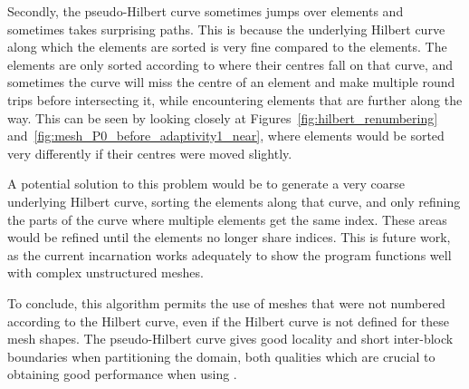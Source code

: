 Secondly, the pseudo-Hilbert curve sometimes jumps over elements and sometimes takes surprising
paths. This is because the underlying Hilbert curve along which the elements are sorted is very fine
compared to the elements. The elements are only sorted according to where their centres fall on that
curve, and sometimes the curve will miss the centre of an element and make multiple round trips
before intersecting it, while encountering elements that are further along the way. This can be seen
by looking closely at Figures~\ref{fig:hilbert_renumbering}
and~\ref{fig:mesh_P0_before_adaptivity1_near}, where elements would be sorted very differently if
their centres were moved slightly.

A potential solution to this problem would be to generate a very coarse underlying Hilbert curve,
sorting the elements along that curve, and only refining the parts of the curve where multiple
elements get the same index. These areas would be refined until the elements no longer share
indices. This is future work, as the current incarnation works adequately to show the program
functions well with complex unstructured meshes.

To conclude, this algorithm permits the use of meshes that were not numbered according to the
Hilbert curve, even if the Hilbert curve is not defined for these mesh shapes. The pseudo-Hilbert
curve gives good locality and short inter-block boundaries when partitioning the domain, both
qualities which are crucial to obtaining good performance when using .
